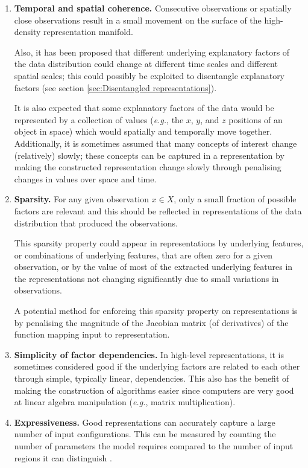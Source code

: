 \begin{enumerate}
    \item \textbf{Temporal and spatial coherence.}
    Consecutive observations or spatially close observations result in a small movement on the surface of the high-density representation manifold.

    Also, it has been proposed that different underlying explanatory factors of the data distribution could change at different time scales and different spatial scales; this could possibly be exploited to disentangle explanatory factors (see section \ref{sec:Disentangled representations}).
    
    It is also expected that some explanatory factors of the data would be represented by a collection of values (\textit{e.g.}, the $x$, $y$, and $z$ positions of an object in space) which would spatially and temporally move together.
    Additionally, it is sometimes assumed that many concepts of interest change (relatively) slowly; these concepts can be captured in a representation by making the constructed representation change slowly through penalising changes in values over space and time.

    \item \textbf{Sparsity.}
    For any given observation $x \in X$, only a small fraction of possible factors are relevant and this should be reflected in representations of the data distribution that produced the observations.
    
    This sparsity property could appear in representations by underlying features, or combinations of underlying features, that are often zero for a given observation, or by the value of most of the extracted underlying features in the representations not changing significantly due to small variations in observations.
    
    A potential method for enforcing this sparsity property on representations is by penalising the magnitude of the Jacobian matrix (of derivatives) of the function mapping input to representation.
    
    \item \textbf{Simplicity of factor dependencies.}
    In high-level representations, it is sometimes considered good if the underlying factors are related to each other through simple, typically linear, dependencies.
    This also has the benefit of making the construction of algorithms easier since computers are very good at linear algebra manipulation (\textit{e.g.}, matrix multiplication).
    
    \item \textbf{Expressiveness.} Good representations can accurately capture a large number of input configurations. This can be measured by counting the number of parameters the model requires compared to the number of input regions it can distinguish \autocite{Luo2019}.
\end{enumerate}


